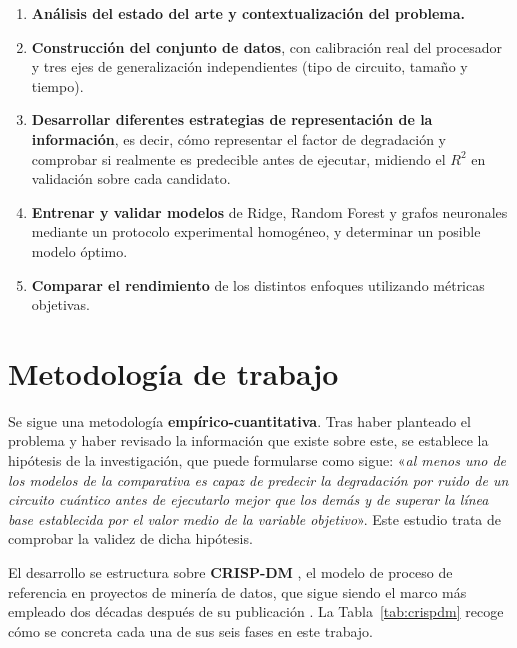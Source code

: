 \begin{enumerate}
    \item \textbf{Análisis del estado del arte y contextualización del problema.}
    \item \textbf{Construcción del conjunto de datos}, con calibración real del procesador y
          tres ejes de generalización independientes (tipo de circuito, tamaño y tiempo).
    \item \textbf{Desarrollar diferentes estrategias de representación de la información}, es decir, cómo representar el factor de degradación y comprobar si realmente es predecible antes de ejecutar, midiendo el $R^2$ en validación sobre cada candidato.
    \item \textbf{Entrenar y validar modelos} de Ridge, Random Forest y grafos neuronales mediante un protocolo experimental homogéneo, y determinar un posible modelo óptimo.
    \item \textbf{Comparar el rendimiento} de los distintos enfoques utilizando métricas objetivas.
\end{enumerate}


\section{Metodología de trabajo}
\label{sec:metodologia}

Se sigue una metodología \textbf{empírico-cuantitativa}. Tras haber planteado el problema y haber revisado la información que existe sobre este, se establece la hipótesis de la investigación, que puede formularse como sigue: «\textit{al menos uno de los modelos de la comparativa es capaz de predecir la degradación por ruido de un circuito cuántico antes de ejecutarlo mejor que los demás y de superar la línea base establecida por el valor medio de la variable objetivo}». Este estudio trata de comprobar la validez de dicha hipótesis.

El desarrollo se estructura sobre \textbf{CRISP-DM} \cite{wirth2000crispdm}, el modelo de
proceso de referencia en proyectos de minería de datos, que sigue siendo el marco más
empleado dos décadas después de su publicación \cite{schroer2021crispdm}. La
Tabla~\ref{tab:crispdm} recoge cómo se concreta cada una de sus seis fases en este trabajo.

